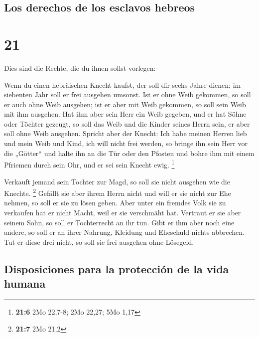 \hypertarget{los-derechos-de-los-esclavos-hebreos}{%
\subsection{Los derechos de los esclavos
hebreos}\label{los-derechos-de-los-esclavos-hebreos}}

\hypertarget{section-20}{%
\section{21}\label{section-20}}

 Dies sind die Rechte, die du ihnen sollst vorlegen:

 Wenn du einen hebräischen Knecht kaufst, der soll dir
sechs Jahre dienen; im siebenten Jahr soll er frei ausgehen umsonst.
 Ist er ohne Weib gekommen, so soll er auch ohne Weib
ausgehen; ist er aber mit Weib gekommen, so soll sein Weib mit ihm
ausgehen.  Hat ihm aber sein Herr ein Weib gegeben, und er
hat Söhne oder Töchter gezeugt, so soll das Weib und die Kinder seines
Herrn sein, er aber soll ohne Weib ausgehen.  Spricht aber
der Knecht: Ich habe meinen Herren lieb und mein Weib und Kind, ich will
nicht frei werden,  so bringe ihn sein Herr vor die
„Götter`` und halte ihn an die Tür oder den Pfosten und bohre ihm mit
einem Pfriemen durch sein Ohr, und er sei sein Knecht ewig. \footnote{\textbf{21:6}
  2Mo 22,7-8; 2Mo 22,27; 5Mo 1,17}

 Verkauft jemand sein Tochter zur Magd, so soll sie nicht
ausgehen wie die Knechte. \footnote{\textbf{21:7} 2Mo 21,2}
 Gefällt sie aber ihrem Herrn nicht und will er sie nicht
zur Ehe nehmen, so soll er sie zu lösen geben. Aber unter ein fremdes
Volk sie zu verkaufen hat er nicht Macht, weil er sie verschmäht hat.
 Vertraut er sie aber seinem Sohn, so soll er Tochterrecht
an ihr tun.  Gibt er ihm aber noch eine andere, so soll
er an ihrer Nahrung, Kleidung und Eheschuld nichts abbrechen.
 Tut er diese drei nicht, so soll sie frei ausgehen ohne
Lösegeld.

\hypertarget{disposiciones-para-la-protecciuxf3n-de-la-vida-humana}{%
\subsection{Disposiciones para la protección de la vida
humana}\label{disposiciones-para-la-protecciuxf3n-de-la-vida-humana}}

